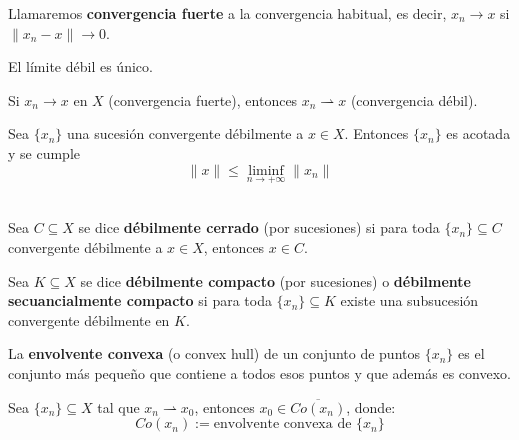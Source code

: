 \documentclass[12pt]{book}
\newcommand{\tbf}{\textbf}
\begin{document}
\begin{observacion}
    Llamaremos \tbf{convergencia fuerte} a la convergencia habitual, es decir, $x_n \longrightarrow x$ si \mbox{$\|x_n - x\| \longrightarrow 0$}.
\end{observacion}

\begin{prop}
    El límite débil es único. \\
\end{prop}

\begin{prop}
    Si $x_n \longrightarrow x$ en $X$ (convergencia fuerte), entonces $x_n\rightharpoonup x$ (convergencia débil).
\end{prop}

\begin{prop}
    Sea $\{x_n\}$ una sucesión convergente débilmente a $x \in X$. Entonces $\{x_n\}$ es acotada y se cumple
    \begin{equation*}
        \|x\| \le \liminf_{n \to +\infty} \|x_n\| 
    \end{equation*} \\
\end{prop}


\begin{definicion}
    Sea $C\subseteq X$ se dice \tbf{débilmente cerrado} (por sucesiones) si para toda $\{x_n\} \subseteq C$ convergente débilmente a $x \in X$, entonces $x \in C$.
\end{definicion}

\begin{definicion}
    Sea $K\subseteq X$ se dice \tbf{débilmente compacto} (por sucesiones) o \tbf{débilmente secuancialmente compacto} si para toda $\{x_n\} \subseteq K$ existe una subsucesión convergente débilmente en $K$.
\end{definicion}

\begin{observacion}
    La \tbf{envolvente convexa} (o convex hull) de un conjunto de puntos $\{x_n\}$ es el conjunto más pequeño que contiene a todos esos puntos y que además es convexo. \\
\end{observacion}

\begin{teo}[Mazur]
    Sea $\{x_n\} \subseteq X$ tal que $x_n \rightharpoonup x_0$, entonces $x_0 \in \overline{Co(x_n)}$, donde:
    \begin{equation*}
        Co(x_n) := \text{envolvente convexa de } \{x_n\}
    \end{equation*}
\end{teo}
\end{document}
